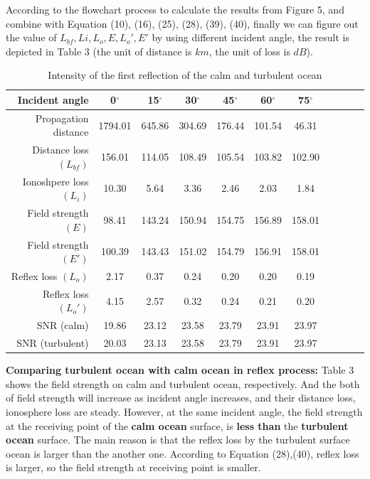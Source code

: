 \documentclass{mcmthesis}
\begin{document}
According to the flowchart process to calculate the results from Figure 5, and combine with Equation (10), (16),  (25), (28), (39), (40), finally we can figure out the value of $L_{bf},L{i},L_o,E,L_o',E'$ by using different incident angle, the result is depicted in Table 3 (the unit of distance is $km$, the unit of loss is $dB$). 

 \begin{longtable}{r  cccccccccc}
 \caption{Intensity of the first reflection of the calm and turbulent ocean} \\
  \toprule
  Incident angle & 0$^\circ$&   15$^\circ$&  30$^\circ$&  45$^\circ$&  60$^\circ$&  75$^\circ$ \\
  \midrule
Propagation distance &   1794.01&    645.86&  304.69&  176.44&  101.54  &46.31\\
Distance loss $(L_{bf})$ &  156.01&  114.05 & 108.49 & 105.54 & 103.82 & 102.90  \\
Ionoshpere loss $(L_{i})$ &10.30 &  5.64 &   3.36  &  2.46  &  2.03   & 1.84   \\

Field strength $(E)$ & 98.41 &  143.24 & 150.94 & 154.75 & 156.89 & 158.01 \\
Field strength $(E')$  &100.39 &    143.43 &    151.02 &    154.79&     156.91 &    158.01   \\
Reflex loss $(L_o)$ & 2.17 &   0.37   & 0.24   & 0.20    &0.20   & 0.19   \\
Reflex loss $(L_{o}')$& 4.15  &  2.57  &  0.32 &   0.24   & 0.21 &   0.20  \\
SNR (calm) & 19.86 &  23.12  & 23.58 &  23.79 &  23.91 &  23.97   \\
SNR (turbulent) &20.03&   23.13  & 23.58 &  23.79 &  23.91 &  23.97 \\
  \bottomrule
 \end{longtable}

\textbf{Comparing turbulent ocean with calm ocean in reflex process: } Table 3 shows the field strength on calm and turbulent ocean, respectively. And the both of field strength will increase as incident angle increases, and their distance loss, ionosphere loss are steady. However, at the same incident angle, the field strength at the receiving point of the \textbf{calm ocean} surface, is \textbf{less than} the \textbf{turbulent ocean} surface. The main reason is that the reflex loss by the turbulent surface ocean is larger than the another one. According to Equation (28),(40), reflex loss is larger, so the field strength at receiving point is smaller.
\end{document}
